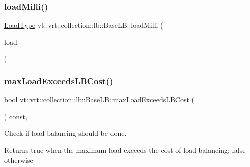 \subsubsection{\texorpdfstring{load\+Milli()}{loadMilli()}}
{\footnotesize\ttfamily \hyperlink{namespacevt_a8fb51741340b87d7aaee0bef60e9896b}{Load\+Type} vt\+::vrt\+::collection\+::lb\+::\+Base\+L\+B\+::load\+Milli (\begin{DoxyParamCaption}\item[{\hyperlink{namespacevt_a8fb51741340b87d7aaee0bef60e9896b}{Load\+Type} const \&}]{load }\end{DoxyParamCaption})}

\mbox{\label{structvt_1_1vrt_1_1collection_1_1lb_1_1_base_l_b_a5ec697fdb24de2be20a754086d156d8f}} 
\subsubsection{\texorpdfstring{max\+Load\+Exceeds\+L\+B\+Cost()}{maxLoadExceedsLBCost()}}
{\footnotesize\ttfamily bool vt\+::vrt\+::collection\+::lb\+::\+Base\+L\+B\+::max\+Load\+Exceeds\+L\+B\+Cost (\begin{DoxyParamCaption}{ }\end{DoxyParamCaption}) const\hspace{0.3cm}{\ttfamily [inline]}, {\ttfamily [protected]}}



Check if load-\/balancing should be done. 

\begin{DoxyReturn}{Returns}
true when the maximum load exceeds the cost of load balancing; false otherwise 
\end{DoxyReturn}
\mbox{\label{structvt_1_1vrt_1_1collection_1_1lb_1_1_base_l_b_a952846044ca0d13d25ca828b84112d0e}} 
